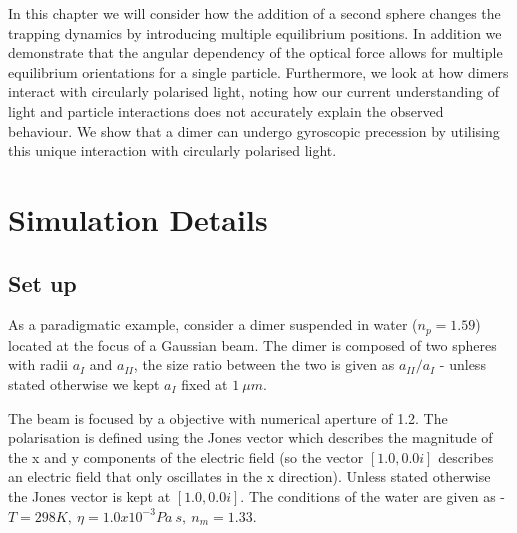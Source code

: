  In this chapter we will consider how the addition of a 
 second sphere changes the trapping dynamics by introducing 
 multiple equilibrium positions. In addition we demonstrate 
 that the angular dependency of the optical force allows for 
 multiple equilibrium orientations for a single particle. 
 Furthermore, we look at how dimers interact with circularly 
 polarised light, noting how our current understanding of 
 light and particle interactions does not accurately explain 
 the observed behaviour. We show that a dimer can undergo 
 gyroscopic precession by utilising this unique interaction 
 with circularly polarised light.  
 
\section{Simulation Details}
\subsection{Set up}
As a paradigmatic example, consider a dimer suspended in 
water ($n_p = 1.59$) located at the focus of a Gaussian 
beam. The dimer is composed of two spheres with radii 
$a_I$ and $a_{II}$, the size ratio between the two is 
given as $a_{II}/a_{I}$ - unless stated otherwise we 
kept $a_I$ fixed at $1\ \mu m$. 

The beam is focused by a objective with numerical aperture 
of 1.2. The polarisation is defined using the Jones vector 
which describes the magnitude of the x and y components of 
the electric field (so the vector $[1.0, 0.0i]$ describes 
an electric field that only oscillates in the x direction). 
Unless stated otherwise the Jones vector is kept at $[1.0, 
0.0i]$. The conditions of the water are given as - $T = 298K,\ 
\eta = 1.0x10^{-3}Pa\ s,\ n_m = 1.33$.

